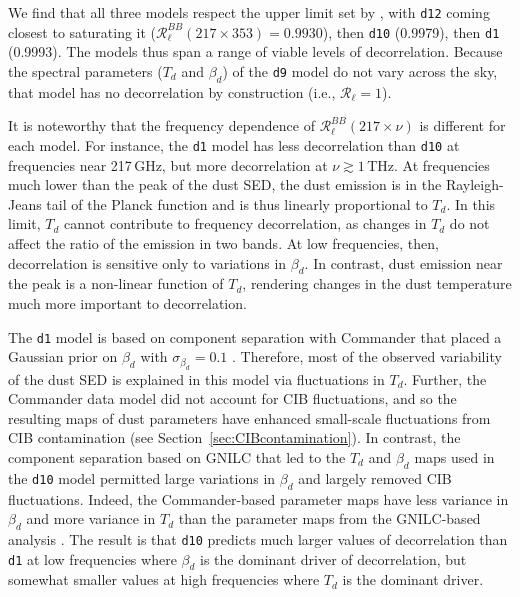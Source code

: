 \documentclass[twocolumn]{aastex631}
\begin{document}
We find that all three models respect the upper limit set by \citet{planck2016-l11A}, with \texttt{d12} coming closest to saturating it ($\mathcal{R}_\ell^{BB}(217\times353) = 0.9930$), then \texttt{d10} (0.9979), then \texttt{d1} (0.9993). The models thus span a range of viable levels of decorrelation. Because the spectral parameters ($T_d$ and $\beta_d$) of the \texttt{d9} model do not vary across the sky, that model has no decorrelation by construction (i.e., $\mathcal{R}_\ell = 1$).

It is noteworthy that the frequency dependence of $\mathcal{R}_\ell^{BB}(217\times\nu)$ is different for each model. For instance, the \texttt{d1} model has less decorrelation than \texttt{d10} at frequencies near 217\,GHz, but more decorrelation at $\nu \gtrsim 1$\,THz. At frequencies much lower than the peak of the dust SED, the dust emission is in the Rayleigh-Jeans tail of the Planck function and is thus linearly proportional to $T_d$. In this limit, $T_d$ cannot contribute to frequency decorrelation, as changes in $T_d$ do not affect the ratio of the emission in two bands. At low frequencies, then, decorrelation is sensitive only to variations in $\beta_d$. In contrast, dust emission near the peak is a non-linear function of $T_d$, rendering changes in the dust temperature much more important to decorrelation. 

The \texttt{d1} model is based on component separation with Commander that placed a Gaussian prior on $\beta_d$ with $\sigma_{\beta_d} = 0.1$ \citep{planck2014-a12}. Therefore, most of the observed variability of the dust SED is explained in this model via fluctuations in $T_d$. Further, the Commander data model did not account for CIB fluctuations, and so the resulting maps of dust parameters have enhanced small-scale fluctuations from CIB contamination (see Section~\ref{sec:CIBcontamination}). In contrast, the component separation based on GNILC that led to the $T_d$ and $\beta_d$ maps used in the \texttt{d10} model \citep{planck2016-XLVIII} permitted large variations in $\beta_d$ and largely removed CIB fluctuations. Indeed, the Commander-based parameter maps have less variance in $\beta_d$ and more variance in $T_d$ than the parameter maps from the GNILC-based analysis \citep[see][Table~1]{planck2016-XLVIII}. The result is that \texttt{d10} predicts much larger values of decorrelation than \texttt{d1} at low frequencies where $\beta_d$ is the dominant driver of decorrelation, but somewhat smaller values at high frequencies where $T_d$ is the dominant driver.
\end{document}
